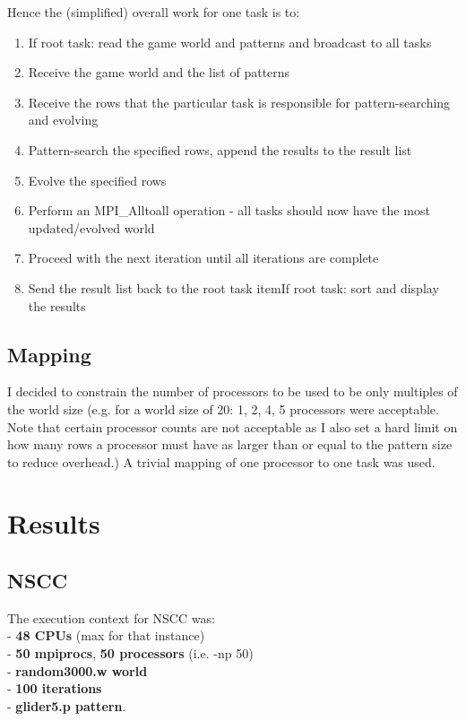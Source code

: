 \documentclass[12pt,a4paper]{article}
\begin{document}
Hence the (simplified) overall work for one task is to: \\
\begin{enumerate}
\item{If root task: read the game world and patterns and broadcast to all tasks}
\item{Receive the game world and the list of patterns}
\item{Receive the rows that the particular task is responsible for pattern-searching and evolving}
\item{Pattern-search the specified rows, append the results to the result list}
\item{Evolve the specified rows}
\item{Perform an MPI\_Alltoall operation - all tasks should now have the most updated/evolved world}
\item{Proceed with the next iteration until all iterations are complete}
\item{Send the result list back to the root task}
item{If root task: sort and display the results}
\end{enumerate}

\subsection{Mapping}
I decided to constrain the number of processors to be used to be only multiples of the world size (e.g. for a world size of 20: 1, 2, 4, 5 processors were acceptable. Note that certain processor counts are not acceptable as I also set a hard limit on how many rows a processor must have as larger than or equal to the pattern size to reduce overhead.) A trivial mapping of one processor to one task was used. 

\newpage	

\section{Results}

\subsection{NSCC}

The execution context for NSCC was: \\

- \textbf{48 CPUs} (max for that instance) \\
- \textbf{50 mpiprocs}, \textbf{50 processors} (i.e. -np 50)\\
- \textbf{random3000.w world}\\
- \textbf{100 iterations}\\
- \textbf{glider5.p pattern}. 
\end{document}
